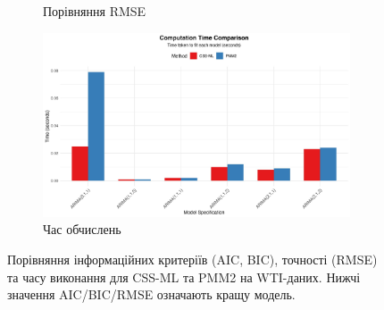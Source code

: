 \documentclass[12pt,a4paper]{article}
\begin{document}
\begin{figure}[htbp]
\begin{subfigure}[b]{0.48\textwidth}
    \caption{Порівняння RMSE}
    \label{fig:wti_rmse}
\end{subfigure}
\hfill
\begin{subfigure}[b]{0.48\textwidth}
    \centering
    \includegraphics[width=\textwidth]{figures/04_computation_time.pdf}
    \caption{Час обчислень}
    \label{fig:wti_time}
\end{subfigure}
\caption{Порівняння інформаційних критеріїв (AIC, BIC), точності (RMSE) та часу виконання для CSS-ML та PMM2 на WTI-даних. Нижчі значення AIC/BIC/RMSE означають кращу модель.}
\label{fig:wti_criteria}
\end{figure}
\end{document}
